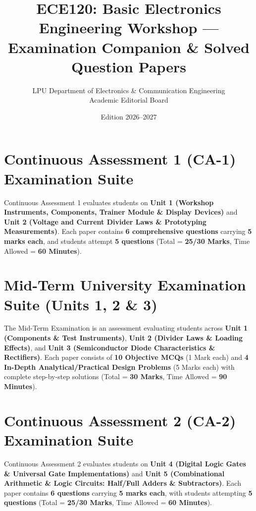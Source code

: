 \documentclass[a4paper,11pt,oneside,openany]{book}
\title{ECE120: Basic Electronics Engineering Workshop --- Examination Companion \& Solved Question Papers}
\author{LPU Department of Electronics \& Communication Engineering\\Academic Editorial Board}
\date{Edition 2026--2027}
\begin{document}
\frontmatter




\tableofcontents
\newpage

\mainmatter

\chapter{Continuous Assessment 1 (CA-1) Examination Suite}
\label{chap:ca1}
\noindent
Continuous Assessment 1 evaluates students on \textbf{Unit 1 (Workshop Instruments, Components, Trainer Module \& Display Devices)} and \textbf{Unit 2 (Voltage and Current Divider Laws \& Prototyping Measurements)}. Each paper contains \textbf{6 comprehensive questions} carrying \textbf{5 marks each}, and students attempt \textbf{5 questions} (Total = \textbf{25/30 Marks}, Time Allowed = \textbf{60 Minutes}).

\newpage



\chapter{Mid-Term University Examination Suite (Units 1, 2 \& 3)}
\label{chap:midterm}
\noindent
The Mid-Term Examination is an assessment evaluating students across \textbf{Unit 1 (Components \& Test Instruments)}, \textbf{Unit 2 (Divider Laws \& Loading Effects)}, and \textbf{Unit 3 (Semiconductor Diode Characteristics \& Rectifiers)}. Each paper consists of \textbf{10 Objective MCQs} (1 Mark each) and \textbf{4 In-Depth Analytical/Practical Design Problems} (5 Marks each) with complete step-by-step solutions (Total = \textbf{30 Marks}, Time Allowed = \textbf{90 Minutes}).

\newpage



\chapter{Continuous Assessment 2 (CA-2) Examination Suite}
\label{chap:ca2}
\noindent
Continuous Assessment 2 evaluates students on \textbf{Unit 4 (Digital Logic Gates \& Universal Gate Implementations)} and \textbf{Unit 5 (Combinational Arithmetic \& Logic Circuits: Half/Full Adders \& Subtractors)}. Each paper contains \textbf{6 questions} carrying \textbf{5 marks each}, with students attempting \textbf{5 questions} (Total = \textbf{25/30 Marks}, Time Allowed = \textbf{60 Minutes}).
\end{document}
